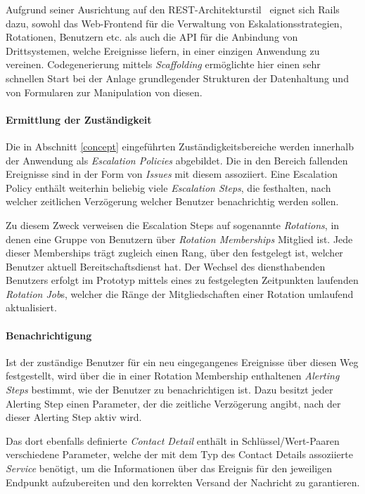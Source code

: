 \documentclass[11pt,utf8,notoc,bibnum,german,final]{zihpub}
\begin{document}
Aufgrund seiner Ausrichtung auf den REST-Architekturstil~\cite{fielding-rest}
eignet sich Rails dazu, sowohl das Web-Frontend für die Verwaltung von
Eskalationsstrategien, Rotationen, Benutzern etc. als auch die API für die
Anbindung von Drittsystemen, welche Ereignisse liefern, in einer einzigen
Anwendung zu vereinen. Codegenerierung mittels \emph{Scaffolding} ermöglichte
hier einen sehr schnellen Start bei der Anlage grundlegender Strukturen der
Datenhaltung und von Formularen zur Manipulation von diesen.

\paragraph{Ermittlung der Zuständigkeit}

Die in Abschnitt \ref{concept} eingeführten Zuständigkeitsbereiche werden
innerhalb der Anwendung als \emph{Escalation Policies} abgebildet. Die in den
Bereich fallenden Ereignisse sind in der Form von \emph{Issues} mit diesem
assoziiert. Eine Escalation Policy enthält weiterhin beliebig viele
\emph{Escalation Steps}, die festhalten, nach welcher zeitlichen Verzögerung
welcher Benutzer benachrichtig werden sollen.

Zu diesem Zweck verweisen die Escalation Steps auf sogenannte \emph{Rotations},
in denen eine Gruppe von Benutzern über \emph{Rotation Memberships} Mitglied
ist. Jede dieser Memberships trägt zugleich einen Rang, über den festgelegt
ist, welcher Benutzer aktuell Bereitschaftsdienst hat. Der Wechsel des
diensthabenden Benutzers erfolgt im Prototyp mittels eines zu festgelegten
Zeitpunkten laufenden \emph{Rotation Job}s, welcher die Ränge der
Mitgliedschaften einer Rotation umlaufend aktualisiert.

\paragraph{Benachrichtigung}

Ist der zuständige Benutzer für ein neu eingegangenes Ereignisse über diesen
Weg festgestellt, wird über die in einer Rotation Membership enthaltenen
\emph{Alerting Steps} bestimmt, wie der Benutzer zu benachrichtigen ist. Dazu
besitzt jeder Alerting Step einen Parameter, der die zeitliche Verzögerung
angibt, nach der dieser Alerting Step aktiv wird.

Das dort ebenfalls definierte \emph{Contact Detail} enthält in
Schlüssel/Wert-Paaren verschiedene Parameter, welche der mit dem Typ des
Contact Details assoziierte \emph{Service} benötigt, um die Informationen über
das Ereignis für den jeweiligen Endpunkt aufzubereiten und den korrekten
Versand der Nachricht zu garantieren.
\end{document}
